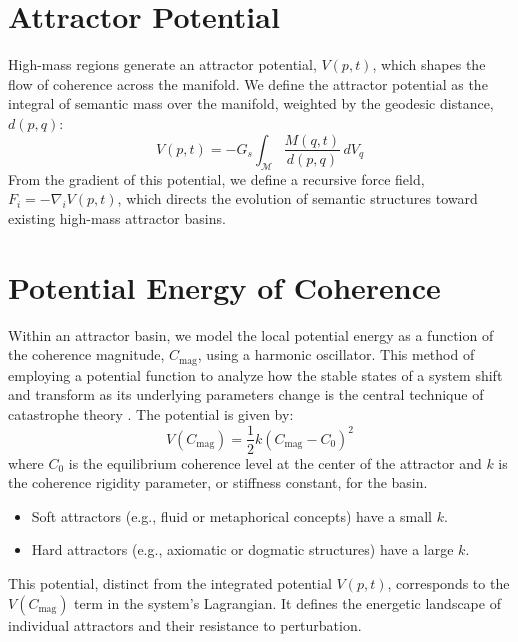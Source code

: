 \section{Attractor Potential}\label{sec:attractor_potential}

High-mass regions generate an attractor potential, \(V(p,t)\), which shapes the flow of coherence across the manifold. We define the attractor potential as the integral of semantic mass over the manifold, weighted by the geodesic distance, \(d(p, q)\):
\begin{equation}
V(p, t) = -G_s \int_{\mathcal{M}} \frac{M(q, t)}{d(p, q)} \, dV_q
\end{equation}
From the gradient of this potential, we define a recursive force field, \(F_i = -\nabla_i V(p,t)\), which directs the evolution of semantic structures toward existing high-mass attractor basins.

\section{Potential Energy of Coherence}\label{sec:potential_energy_of_coherence}

Within an attractor basin, we model the local potential energy as a function of the coherence magnitude, \(C_{\text{mag}}\), using a harmonic oscillator. This method of employing a potential function to analyze how the stable states of a system shift and transform as its underlying parameters change is the central technique of catastrophe theory \autocite{Thom1975}. The potential is given by:
\begin{equation}\label{eq:attractor_potential}
V(C_{\text{mag}}) = \frac{1}{2}k(C_{\text{mag}} - C_0)^2
\end{equation}
where \(C_0\) is the equilibrium coherence level at the center of the attractor and \(k\) is the coherence rigidity parameter, or stiffness constant, for the basin.
\begin{itemize}
    \item Soft attractors (e.g., fluid or metaphorical concepts) have a small \(k\).
    \item Hard attractors (e.g., axiomatic or dogmatic structures) have a large \(k\).
\end{itemize}
This potential, distinct from the integrated potential \(V(p,t)\), corresponds to the \(V(C_{\text{mag}})\) term in the system's Lagrangian. It defines the energetic landscape of individual attractors and their resistance to perturbation. 